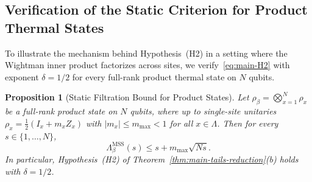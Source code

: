 \documentclass[11pt,a4paper]{article}
\numberwithin{equation}{section}
\theoremstyle{plain}
\newtheorem{proposition}[theorem]{Proposition}
\theoremstyle{definition}
\newcommand{\MSS}{\mathrm{MSS}}
\begin{document}
\subsection{Verification of the Static Criterion for Product Thermal States}\label{subsec:product-states}

To illustrate the mechanism behind Hypothesis~(H2) in a setting where the Wightman inner product factorizes across sites, we verify~\eqref{eq:main-H2} with exponent $\delta = 1/2$ for every full-rank product thermal state on $N$ qubits.

\begin{proposition}[Static Filtration Bound for Product States]\label{prop:product}
Let $\rho_\beta = \bigotimes_{x=1}^N \rho_x$ be a full-rank product state on $N$ qubits, where up to single-site unitaries $\rho_x = \frac{1}{2}(I_x + m_x Z_x)$ with $|m_x| \le m_{\max} < 1$ for all $x\in\Lambda$. Then for every $s\in\{1,\dots,N\}$,
\begin{equation}\label{eq:product-bound}
  \Lambda_\beta^{\MSS}(s) \le s + m_{\max}\sqrt{Ns}.
\end{equation}
In particular, Hypothesis~\emph{(H2)} of Theorem~\ref{thm:main-tails-reduction}(b) holds with $\delta = 1/2$.
\end{proposition}
\end{document}
